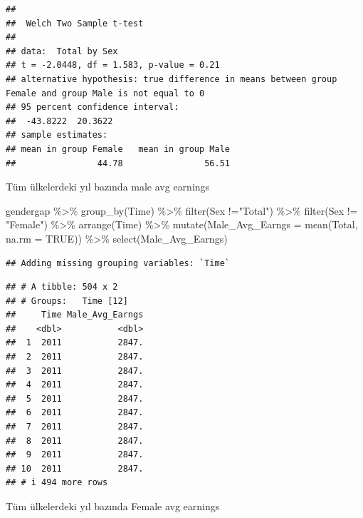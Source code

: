 \documentclass[
]{article}
\newenvironment{Shaded}{\begin{snugshade}}{\end{snugshade}}
\newcommand{\AttributeTok}[1]{\textcolor[rgb]{0.77,0.63,0.00}{#1}}
\newcommand{\ConstantTok}[1]{\textcolor[rgb]{0.00,0.00,0.00}{#1}}
\newcommand{\FunctionTok}[1]{\textcolor[rgb]{0.00,0.00,0.00}{#1}}
\newcommand{\NormalTok}[1]{#1}
\newcommand{\SpecialCharTok}[1]{\textcolor[rgb]{0.00,0.00,0.00}{#1}}
\newcommand{\StringTok}[1]{\textcolor[rgb]{0.31,0.60,0.02}{#1}}
\begin{document}
\begin{verbatim}
## 
##  Welch Two Sample t-test
## 
## data:  Total by Sex
## t = -2.0448, df = 1.583, p-value = 0.21
## alternative hypothesis: true difference in means between group Female and group Male is not equal to 0
## 95 percent confidence interval:
##  -43.8222  20.3622
## sample estimates:
## mean in group Female   mean in group Male 
##                44.78                56.51
\end{verbatim}

Tüm ülkelerdeki yıl bazında male avg earnings

\begin{Shaded}
\begin{Highlighting}[]
\NormalTok{gendergap }\SpecialCharTok{\%\textgreater{}\%}
  \FunctionTok{group\_by}\NormalTok{(Time) }\SpecialCharTok{\%\textgreater{}\%}
  \FunctionTok{filter}\NormalTok{(Sex }\SpecialCharTok{!=}\StringTok{"Total"}\NormalTok{) }\SpecialCharTok{\%\textgreater{}\%}
  \FunctionTok{filter}\NormalTok{(Sex }\SpecialCharTok{!=} \StringTok{"Female"}\NormalTok{) }\SpecialCharTok{\%\textgreater{}\%}
  \FunctionTok{arrange}\NormalTok{(Time) }\SpecialCharTok{\%\textgreater{}\%}
  \FunctionTok{mutate}\NormalTok{(}\AttributeTok{Male\_Avg\_Earngs =} \FunctionTok{mean}\NormalTok{(Total, }\AttributeTok{na.rm =} \ConstantTok{TRUE}\NormalTok{)) }\SpecialCharTok{\%\textgreater{}\%}
  \FunctionTok{select}\NormalTok{(Male\_Avg\_Earngs)}
\end{Highlighting}
\end{Shaded}

\begin{verbatim}
## Adding missing grouping variables: `Time`
\end{verbatim}

\begin{verbatim}
## # A tibble: 504 x 2
## # Groups:   Time [12]
##     Time Male_Avg_Earngs
##    <dbl>           <dbl>
##  1  2011           2847.
##  2  2011           2847.
##  3  2011           2847.
##  4  2011           2847.
##  5  2011           2847.
##  6  2011           2847.
##  7  2011           2847.
##  8  2011           2847.
##  9  2011           2847.
## 10  2011           2847.
## # i 494 more rows
\end{verbatim}

Tüm ülkelerdeki yıl bazında Female avg earnings
\end{document}
